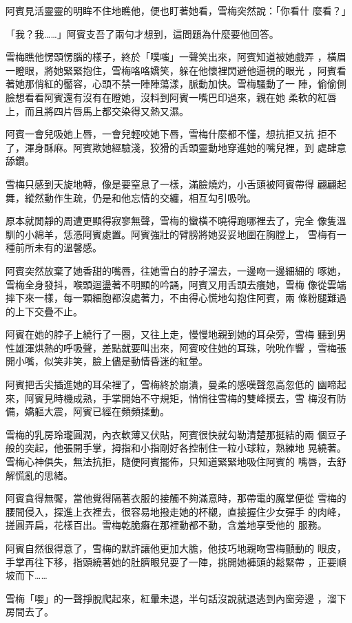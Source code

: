 阿賓見活靈靈的明眸不住地瞧他，便也盯著她看，雪梅突然說：「你看什
麼看？」

「我？我……」阿賓支吾了兩句才想到，這問題為什麼要他回答。

雪梅瞧他愣頭愣腦的樣子，終於「噗嗤」一聲笑出來，阿賓知道被她戲弄
，橫眉一瞪眼，將她緊緊抱住，雪梅咯咯嬌笑，躲在他懷裡閃避他逼視的眼光
，阿賓看著她那俏紅的靨容，心頭不禁一陣陣蕩漾，脈動加快。雪梅騷動了一
陣，偷偷側臉想看看阿賓還有沒有在瞪她，沒料到阿賓一嘴巴印過來，親在她
柔軟的紅唇上，而且將四片唇馬上都交染得又熱又濕。

阿賓一會兒吸她上唇，一會兒輕咬她下唇，雪梅什麼都不懂，想抗拒又抗
拒不了，渾身酥麻。阿賓欺她經驗淺，狡猾的舌頭靈動地穿進她的嘴兒裡，到
處肆意舔鑽。

雪梅只感到天旋地轉，像是要窒息了一樣，滿臉燒灼，小舌頭被阿賓帶得
翩翩起舞，縱然動作生疏，仍是和他忘情的交纏，相互勾引吸吮。

原本就閒靜的周遭更顯得寂寥無聲，雪梅的蠻橫不曉得跑哪裡去了，完全
像隻溫馴的小綿羊，恁憑阿賓處置。阿賓強壯的臂膀將她妥妥地圍在胸膛上，
雪梅有一種前所未有的溫馨感。

阿賓突然放棄了她香甜的嘴唇，往她雪白的脖子溜去，一邊吻一邊細細的
啄她，雪梅全身發抖，喉頭迴盪著不明顯的吟誦，阿賓又用舌頭去癢她，雪梅
像從雲端摔下來一樣，每一顆細胞都沒處著力，不由得心慌地勾抱住阿賓，兩
條粉腿難過的上下交疊不止。

阿賓在她的脖子上繞行了一圈，又往上走，慢慢地親到她的耳朵旁，雪梅
聽到男性雄渾烘熱的呼吸聲，差點就要叫出來，阿賓咬住她的耳珠，吮吮作響
，雪梅張開小嘴，似笑非笑，臉上儘是動情昏迷的紅暈。

阿賓把舌尖插進她的耳朵裡了，雪梅終於崩潰，曼柔的感嘆聲忽高忽低的
幽啼起來，阿賓見時機成熟，手掌開始不守規矩，悄悄往雪梅的雙峰摸去，雪
梅沒有防備，嬌軀大震，阿賓已經在頻頻揉動。

雪梅的乳房玲瓏圓潤，內衣軟薄又伏貼，阿賓很快就勾勒清楚那挺結的兩
個豆子般的突起，他張開手掌，拇指和小指剛好各控制住一粒小球粒，熟練地
晃繞著。雪梅心神俱失，無法抗拒，隨便阿賓擺佈，只知道緊緊地吸住阿賓的
嘴唇，去舒解慌亂的思緒。

阿賓貪得無饜，當他覺得隔著衣服的接觸不夠滿意時，那帶電的魔掌便從
雪梅的腰間侵入，探進上衣裡去，很容易地撥走她的杯櫬，直接握住少女彈手
的肉峰，搓圓弄扁，花樣百出。雪梅乾脆癱在那裡動都不動，含羞地享受他的
服務。

阿賓自然很得意了，雪梅的默許讓他更加大膽，他技巧地親吻雪梅顫動的
眼皮，手掌再往下移，指頭繞著她的肚臍眼兒耍了一陣，挑開她褲頭的鬆緊帶
，正要順坡而下……

雪梅「嚶」的一聲掙脫爬起來，紅暈未退，半句話沒說就退逃到內窗旁邊
，溜下房間去了。

